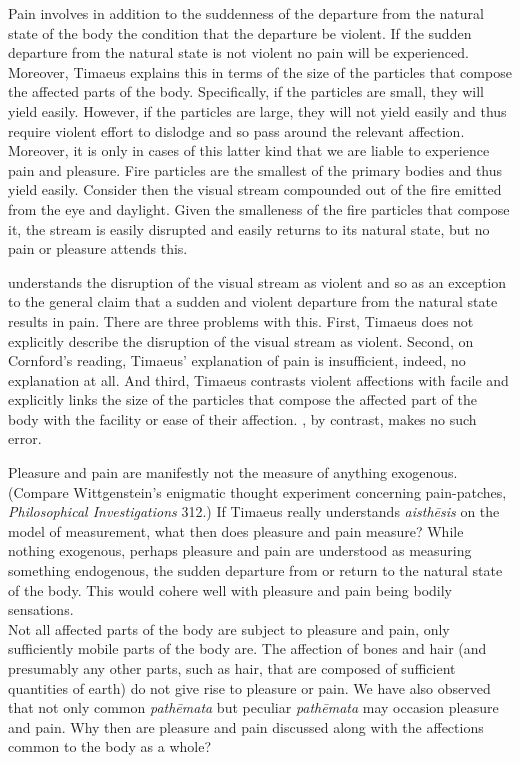 Pain involves in addition to the suddenness of the departure from the natural state of the body the condition that the departure be violent. If the sudden departure from the natural state is not violent no pain will be experienced. Moreover, Timaeus explains this in terms of the size of the particles that compose the affected parts of the body. Specifically, if the particles are small, they will yield easily. However, if the particles are large, they will not yield easily and thus require violent effort to dislodge and so pass around the relevant affection. Moreover, it is only in cases of this latter kind that we are liable to experience pain and pleasure. Fire particles are the smallest of the primary bodies and thus yield easily. Consider then the visual stream compounded out of the fire emitted from the eye and daylight. Given the smalleness of the fire particles that compose it, the stream is easily disrupted and easily returns to its natural state, but no pain or pleasure attends this.

\citet[269]{Cornford:1935fk} understands the disruption of the visual stream as violent and so as an exception to the general claim that a sudden and violent departure from the natural state results in pain. There are three problems with this. First, Timaeus does not explicitly describe the disruption of the visual stream as violent. Second, on Cornford's reading, Timaeus' explanation of pain is insufficient, indeed, no explanation at all. And third, Timaeus contrasts violent affections with facile and explicitly links the size of the particles that compose the affected part of the body with the facility or ease of their affection. \citet[447]{Taylor:1928qb}, by contrast, makes no such error.

Pleasure and pain are manifestly not the measure of anything exogenous. (Compare Wittgenstein's enigmatic thought experiment concerning pain-patches, \emph{Philosophical Investigations} 312.) If Timaeus really understands \emph{aisthēsis} on the model of measurement, what then does pleasure and pain measure? While nothing exogenous, perhaps pleasure and pain are understood as measuring something endogenous, the sudden departure from or return to the natural state of the body. This would cohere well with pleasure and pain being bodily sensations.\\

Not all affected parts of the body are subject to pleasure and pain, only sufficiently mobile parts of the body are. The affection of bones and hair (and presumably any other parts, such as hair, that are composed of sufficient quantities of earth) do not give rise to pleasure or pain. We have also observed that not only common \emph{pathēmata} but peculiar \emph{pathēmata} may occasion pleasure and pain. Why then are pleasure and pain discussed along with the affections common to the body as a whole? 

